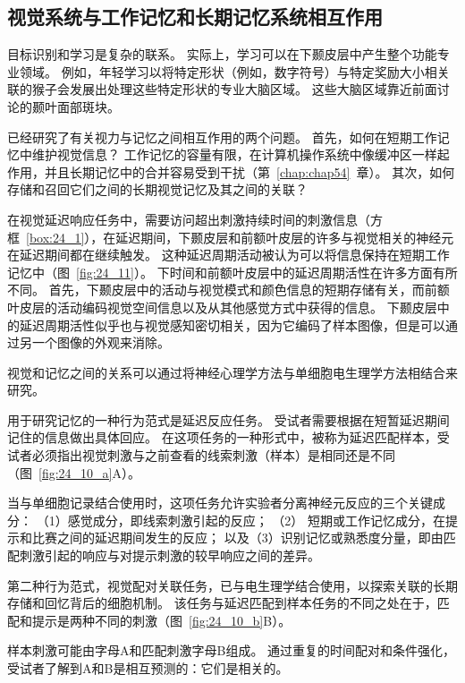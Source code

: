 \subsection{视觉系统与工作记忆和长期记忆系统相互作用}

目标识别和学习是复杂的联系。
实际上，学习可以在下颞皮层中产生整个功能专业领域。 
例如，年轻学习以将特定形状（例如，数字符号）与特定奖励大小相关联的猴子会发展出处理这些特定形状的专业大脑区域。
这些大脑区域靠近前面讨论的颞叶面部斑块。


已经研究了有关视力与记忆之间相互作用的两个问题。
首先，如何在短期工作记忆中维护视觉信息？
工作记忆的容量有限，在计算机操作系统中像缓冲区一样起作用，并且长期记忆中的合并容易受到干扰（第~\ref{chap:chap54}~章）。
其次，如何存储和召回它们之间的长期视觉记忆及其之间的关联？


在视觉延迟响应任务中，需要访问超出刺激持续时间的刺激信息（方框~\ref{box:24_1}），在延迟期间，下颞皮层和前额叶皮层的许多与视觉相关的神经元在延迟期间都在继续触发。
这种延迟周期活动被认为可以将信息保持在短期工作记忆中（图~\ref{fig:24_11}）。
下时间和前额叶皮层中的延迟周期活性在许多方面有所不同。
首先，下颞皮层中的活动与视觉模式和颜色信息的短期存储有关，而前额叶皮层的活动编码视觉空间信息以及从其他感觉方式中获得的信息。
下颞皮层中的延迟周期活性似乎也与视觉感知密切相关，因为它编码了样本图像，但是可以通过另一个图像的外观来消除。


\begin{proposition}[视觉与工作记忆的相互作用研究] \label{box:24_1}
	
	\quad \quad 视觉和记忆之间的关系可以通过将神经心理学方法与单细胞电生理学方法相结合来研究。
	
	\quad \quad 用于研究记忆的一种行为范式是延迟反应任务。
	受试者需要根据在短暂延迟期间记住的信息做出具体回应。
	在这项任务的一种形式中，被称为延迟匹配样本，受试者必须指出视觉刺激与之前查看的线索刺激（样本）是相同还是不同（图~\ref{fig:24_10_a}A）。
	
	\quad \quad 当与单细胞记录结合使用时，这项任务允许实验者分离神经元反应的三个关键成分：
	（1）感觉成分，即线索刺激引起的反应；
	（2） 短期或工作记忆成分，在提示和比赛之间的延迟期间发生的反应；
	以及（3）识别记忆或熟悉度分量，即由匹配刺激引起的响应与对提示刺激的较早响应之间的差异。
	
	\quad \quad 第二种行为范式，视觉配对关联任务，已与电生理学结合使用，以探索关联的长期存储和回忆背后的细胞机制。
	该任务与延迟匹配到样本任务的不同之处在于，匹配和提示是两种不同的刺激（图~\ref{fig:24_10_b}B）。
	
	\quad \quad 样本刺激可能由字母A和匹配刺激字母B组成。
	通过重复的时间配对和条件强化，受试者了解到A和B是相互预测的：它们是相关的。
	
\end{proposition}


